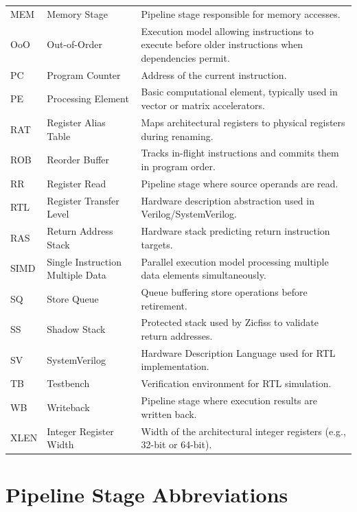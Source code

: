\begin{longtable}{@{}p{}p{}p{}@{}}
MEM & Memory Stage & Pipeline stage responsible for memory accesses. \\
OoO & Out-of-Order & Execution model allowing instructions to execute before older instructions when dependencies permit. \\
PC & Program Counter & Address of the current instruction. \\
PE & Processing Element & Basic computational element, typically used in vector or matrix accelerators. \\
RAT & Register Alias Table & Maps architectural registers to physical registers during renaming. \\
ROB & Reorder Buffer & Tracks in-flight instructions and commits them in program order. \\
RR & Register Read & Pipeline stage where source operands are read. \\
RTL & Register Transfer Level & Hardware description abstraction used in Verilog/SystemVerilog. \\
RAS & Return Address Stack & Hardware stack predicting return instruction targets. \\
SIMD & Single Instruction Multiple Data & Parallel execution model processing multiple data elements simultaneously. \\
SQ & Store Queue & Queue buffering store operations before retirement. \\
SS & Shadow Stack & Protected stack used by Zicfiss to validate return addresses. \\
SV & SystemVerilog & Hardware Description Language used for RTL implementation. \\
TB & Testbench & Verification environment for RTL simulation. \\
WB & Writeback & Pipeline stage where execution results are written back. \\
XLEN & Integer Register Width & Width of the architectural integer registers (e.g., 32-bit or 64-bit). \\
\bottomrule
\end{longtable}
\endgroup

\chapter{Pipeline Stage Abbreviations}

